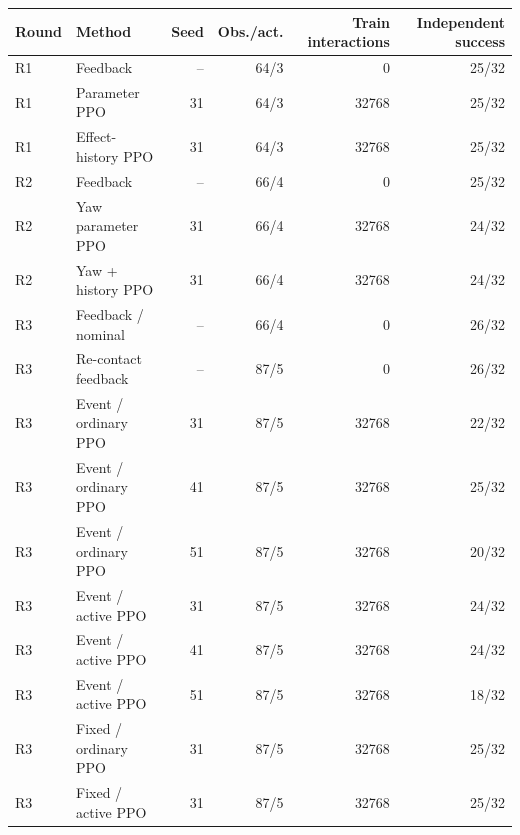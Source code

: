\begin{tabular}{llrrrr}
\toprule
Round & Method & Seed & Obs./act. & Train interactions & Independent success \\
\midrule
R1 & Feedback & -- & 64/3 & 0 & 25/32 \\
R1 & Parameter PPO & 31 & 64/3 & 32768 & 25/32 \\
R1 & Effect-history PPO & 31 & 64/3 & 32768 & 25/32 \\
R2 & Feedback & -- & 66/4 & 0 & 25/32 \\
R2 & Yaw parameter PPO & 31 & 66/4 & 32768 & 24/32 \\
R2 & Yaw + history PPO & 31 & 66/4 & 32768 & 24/32 \\
R3 & Feedback / nominal & -- & 66/4 & 0 & 26/32 \\
R3 & Re-contact feedback & -- & 87/5 & 0 & 26/32 \\
R3 & Event / ordinary PPO & 31 & 87/5 & 32768 & 22/32 \\
R3 & Event / ordinary PPO & 41 & 87/5 & 32768 & 25/32 \\
R3 & Event / ordinary PPO & 51 & 87/5 & 32768 & 20/32 \\
R3 & Event / active PPO & 31 & 87/5 & 32768 & 24/32 \\
R3 & Event / active PPO & 41 & 87/5 & 32768 & 24/32 \\
R3 & Event / active PPO & 51 & 87/5 & 32768 & 18/32 \\
R3 & Fixed / ordinary PPO & 31 & 87/5 & 32768 & 25/32 \\
R3 & Fixed / active PPO & 31 & 87/5 & 32768 & 25/32 \\
\bottomrule
\end{tabular}
